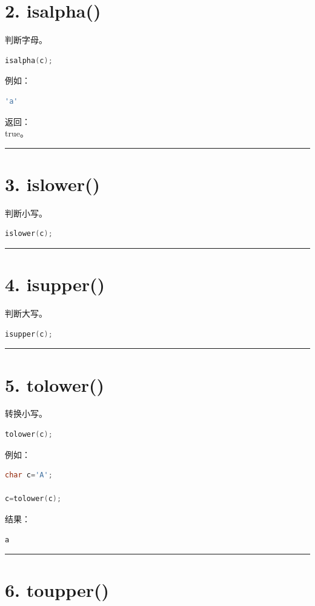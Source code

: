 \documentclass[9pt,twocolumn]{extarticle}
\begin{document}
\section{2. isalpha()}

判断字母。
\begin{lstlisting}[language=C++]
isalpha(c);
\end{lstlisting}
例如：
\begin{lstlisting}[language=C++]
'a'
\end{lstlisting}
返回：\\
true。

\noindent\rule{\linewidth}{0.4pt}

\section{3. islower()}

判断小写。
\begin{lstlisting}[language=C++]
islower(c);
\end{lstlisting}

\noindent\rule{\linewidth}{0.4pt}

\section{4. isupper()}

判断大写。
\begin{lstlisting}[language=C++]
isupper(c);
\end{lstlisting}

\noindent\rule{\linewidth}{0.4pt}

\section{5. tolower()}

转换小写。
\begin{lstlisting}[language=C++]
tolower(c);
\end{lstlisting}
例如：
\begin{lstlisting}[language=C++]
char c='A';

c=tolower(c);
\end{lstlisting}
结果：
\begin{lstlisting}
a
\end{lstlisting}

\noindent\rule{\linewidth}{0.4pt}

\section{6. toupper()}
\end{document}
